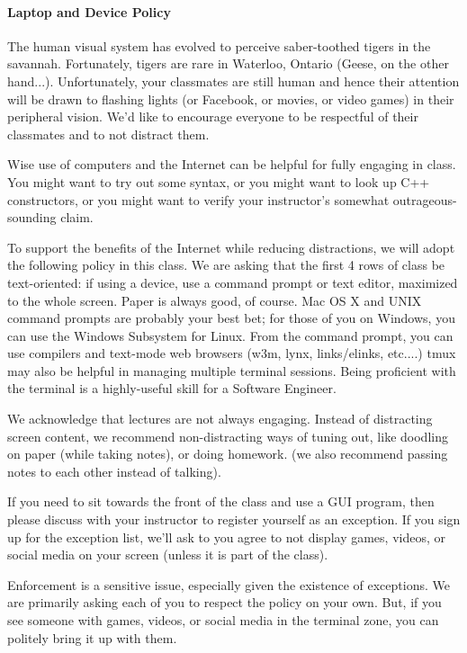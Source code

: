 \documentclass[letterpaper,10pt]{article}
\begin{document}
\paragraph{Laptop and Device Policy}
The human visual system has evolved to perceive saber-toothed tigers
in the savannah. Fortunately, tigers are rare in Waterloo, Ontario
(Geese, on the other hand...).
Unfortunately, your classmates are still human and hence their
attention will be drawn to flashing lights (or Facebook, or movies, or
video games) in their peripheral vision. We'd like to encourage
everyone to be respectful of their classmates and to not distract them.

Wise use of computers and the Internet can be helpful for fully
engaging in class. You might want to try out some syntax, or you might
want to look up C++ constructors, or you might want to verify your
instructor's somewhat outrageous-sounding claim.

To support the benefits of the Internet while reducing distractions,
we will adopt the following policy in this class. We are asking that the
first 4 rows of class be text-oriented: if using a device, use a
command prompt or text editor, maximized to the whole screen. Paper is
always good, of course. Mac OS X and UNIX command prompts are probably
your best bet; for those of you on Windows, you can use the Windows
Subsystem for Linux. From the command prompt, you can use compilers
and text-mode web browsers (w3m, lynx, links/elinks, etc....) tmux may
also be helpful in managing multiple terminal sessions. Being
proficient with the terminal is a highly-useful skill for a Software
Engineer.

We acknowledge that lectures are not always engaging. Instead of
distracting screen content, we recommend non-distracting ways of tuning
out, like doodling on paper (while taking notes), or doing homework.
(we also recommend passing notes to each other instead of talking).

If you need to sit towards the front of the class and use a GUI
program, then please discuss with your instructor to register
yourself as an exception. If you sign up for
the exception list, we'll ask to you agree to not display games,
videos, or social media on your screen (unless it is part of the
class).

Enforcement is a sensitive issue, especially given the existence of
exceptions. We are primarily asking each of you to respect the policy
on your own. But, if you see someone with games, videos, or social
media in the terminal zone, you can politely bring it up with them.
\end{document}
